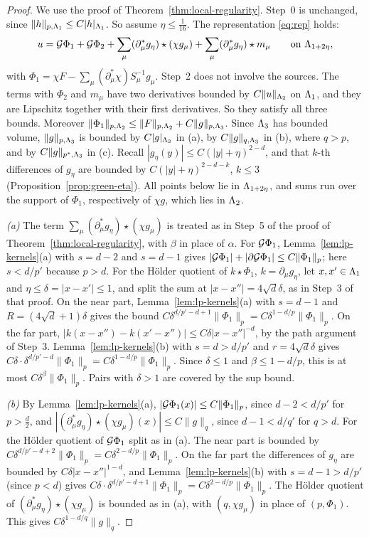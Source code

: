 \begin{proof}
We use the proof of Theorem~\ref{thm:local-regularity}. Step~0 is unchanged, since $\|h\|_{p,\Lambda_1}\le C|h|_{\Lambda_1}$. So assume $\eta\le\frac1{16}$. The representation \eqref{eq:rep} holds:
\[
u=\mathcal G\Phi_1+\mathcal G\Phi_2+\sum_\mu(\partial^*_\mu g_\eta)\star(\chi g_\mu)+\sum_\mu(\partial^*_\mu g_\eta)\star m_\mu\qquad\text{on }\Lambda_{1+2\eta},
\]
with $\Phi_1=\chi F-\sum_\mu(\partial^*_\mu\chi)S_\mu^{-1}g_\mu$. Step~2 does not involve the sources. The terms with $\Phi_2$ and $m_\mu$ have two derivatives bounded by $C\|u\|_{\Lambda_2}$ on $\Lambda_1$, and they are Lipschitz together with their first derivatives. So they satisfy all three bounds. Moreover $\|\Phi_1\|_{p,\Lambda_2}\le\|F\|_{p,\Lambda_2}+C\|g\|_{p,\Lambda_3}$. Since $\Lambda_3$ has bounded volume, $\|g\|_{p,\Lambda_3}$ is bounded by $C|g|_{\Lambda_3}$ in (a), by $C\|g\|_{q,\Lambda_3}$ in (b), where $q>p$, and by $C\|g\|_{p^*,\Lambda_3}$ in (c). Recall $|g_\eta(y)|\le C(|y|+\eta)^{2-d}$, and that $k$-th differences of $g_\eta$ are bounded by $C(|y|+\eta)^{2-d-k}$, $k\le3$ (Proposition~\ref{prop:green-eta}). All points below lie in $\Lambda_{1+2\eta}$, and sums run over the support of $\Phi_1$, respectively of $\chi g$, which lies in $\Lambda_2$.

\emph{(a)} The term $\sum_\mu(\partial^*_\mu g_\eta)\star(\chi g_\mu)$ is treated as in Step~5 of the proof of Theorem~\ref{thm:local-regularity}, with $\beta$ in place of $\alpha$. For $\mathcal G\Phi_1$, Lemma~\ref{lem:lp-kernels}(a) with $s=d-2$ and $s=d-1$ gives $|\mathcal G\Phi_1|+|\partial\mathcal G\Phi_1|\le C\|\Phi_1\|_p$; here $s<d/p'$ because $p>d$. For the H\"older quotient of $k\star\Phi_1$, $k=\partial_\mu g_\eta$, let $x,x'\in\Lambda_1$ and $\eta\le\delta=|x-x'|\le1$, and split the sum at $|x-x''|=4\sqrt d\delta$, as in Step~3 of that proof. On the near part, Lemma~\ref{lem:lp-kernels}(a) with $s=d-1$ and $R=(4\sqrt d+1)\delta$ gives the bound $C\delta^{d/p'-d+1}\|\Phi_1\|_p=C\delta^{1-d/p}\|\Phi_1\|_p$. On the far part, $|k(x-x'')-k(x'-x'')|\le C\delta|x-x''|^{-d}$, by the path argument of Step~3. Lemma~\ref{lem:lp-kernels}(b) with $s=d>d/p'$ and $r=4\sqrt d\delta$ gives $C\delta\cdot\delta^{d/p'-d}\|\Phi_1\|_p=C\delta^{1-d/p}\|\Phi_1\|_p$. Since $\delta\le1$ and $\beta\le1-d/p$, this is at most $C\delta^\beta\|\Phi_1\|_p$. Pairs with $\delta>1$ are covered by the sup bound.

\emph{(b)} By Lemma~\ref{lem:lp-kernels}(a), $|\mathcal G\Phi_1(x)|\le C\|\Phi_1\|_p$, since $d-2<d/p'$ for $p>\frac d2$, and $|(\partial^*_\mu g_\eta)\star(\chi g_\mu)(x)|\le C\|g\|_q$, since $d-1<d/q'$ for $q>d$. For the H\"older quotient of $\mathcal G\Phi_1$ split as in (a). The near part is bounded by $C\delta^{d/p'-d+2}\|\Phi_1\|_p=C\delta^{2-d/p}\|\Phi_1\|_p$. On the far part the differences of $g_\eta$ are bounded by $C\delta|x-x''|^{1-d}$, and Lemma~\ref{lem:lp-kernels}(b) with $s=d-1>d/p'$ (since $p<d$) gives $C\delta\cdot\delta^{d/p'-d+1}\|\Phi_1\|_p=C\delta^{2-d/p}\|\Phi_1\|_p$. The H\"older quotient of $(\partial^*_\mu g_\eta)\star(\chi g_\mu)$ is bounded as in (a), with $(q,\chi g_\mu)$ in place of $(p,\Phi_1)$. This gives $C\delta^{1-d/q}\|g\|_q$.


\end{proof}
